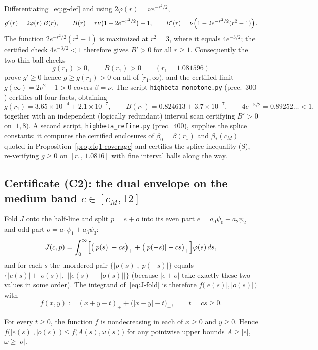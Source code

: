 Differentiating~\eqref{eq:g-def} and using $2\varphi(r)=\nu e^{-r^2/2}$,
\[
        g'(r)=2\varphi(r)\,B(r),
        \qquad
        B(r)=r\nu\bigl(1+2e^{-r^2/2}\bigr)-1,
        \qquad
        B'(r)=\nu\Bigl(1-2e^{-r^2/2}(r^2-1)\Bigr).
\]
The function $2e^{-r^2/2}(r^2-1)$ is maximized at $r^2=3$, where it equals $4e^{-3/2}$; the certified check $4e^{-3/2}<1$ therefore gives $B'>0$ for all $r\ge1$. Consequently the two thin-ball checks
\[
        g(r_1)>0,\qquad B(r_1)>0 \qquad (r_1=1.081596)
\]
prove $g'\ge0$ hence $g\ge g(r_1)>0$ on all of $[r_1,\infty)$, and the certified limit $g(\infty)=2\nu^2-1>0$ covers $\beta=\nu$. The script \texttt{highbeta\_monotone.py} (prec.\ $300$) certifies all four facts, obtaining
\[
        g(r_1)=3.65\times10^{-4}\pm2.1\times10^{-7},
        \qquad
        B(r_1)=0.824613\pm3.7\times10^{-7},
        \qquad
        4e^{-3/2}=0.89252\ldots<1,
\]
together with an independent (logically redundant) interval scan certifying $B'>0$ on $[1,8)$. A second script, \texttt{highbeta\_refine.py} (prec.\ $400$), supplies the splice constants: it computes the certified enclosures of $\beta_0=\beta(r_1)$ and $\beta_*(c_M)$ quoted in Proposition~\ref{prop:fq1-coverage} and certifies the splice inequality (S), re-verifying $g\ge0$ on $[r_1,\,1.0816]$ with fine interval balls along the way.

\subsection{Certificate (C2): the dual envelope on the medium band $c\in[c_M,12]$}
\label{app:cert-envelope}

Fold $J$ onto the half-line and split $p=e+o$ into its even part $e=a_0\psi_0+a_2\psi_2$ and odd part $o=a_1\psi_1+a_3\psi_3$:
\begin{equation}
        J(c,p)=\int_0^\infty\Bigl[\bigl(|p(s)|-cs\bigr)_++\bigl(|p(-s)|-cs\bigr)_+\Bigr]\varphi(s)\,ds ,
        \label{eq:J-fold}
\end{equation}
and for each $s$ the unordered pair $\{|p(s)|,|p(-s)|\}$ equals $\{|e(s)|+|o(s)|,\;\bigl||e(s)|-|o(s)|\bigr|\}$ (because $|e\pm o|$ take exactly these two values in some order). The integrand of~\eqref{eq:J-fold} is therefore $f\bigl(|e(s)|,|o(s)|\bigr)$ with
\[
        f(x,y):=(x+y-t)_++\bigl(|x-y|-t\bigr)_+,\qquad t=cs\ge0 .
\]

\begin{lemma}\label{lem:fold-mono}
For every $t\ge0$, the function $f$ is nondecreasing in each of $x\ge0$ and $y\ge0$. Hence $f\bigl(|e(s)|,|o(s)|\bigr)\le f\bigl(\bar A(s),\omega(s)\bigr)$ for any pointwise upper bounds $\bar A\ge|e|$, $\omega\ge|o|$.
\end{lemma}

